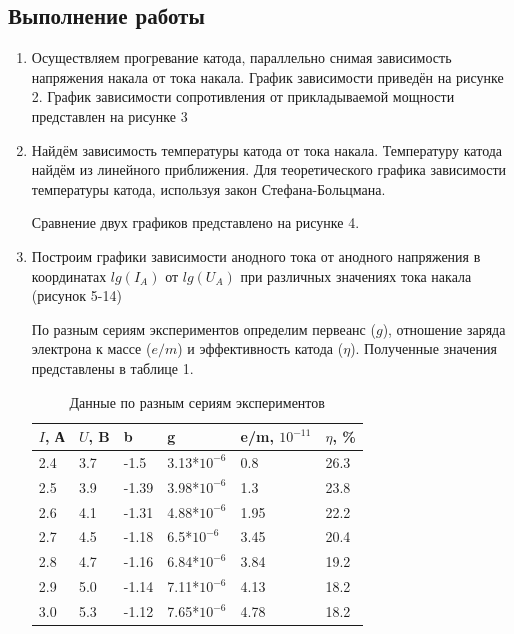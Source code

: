 \documentclass[a4paper]{article}
\begin{document}
\subsection{Выполнение работы}
\begin{enumerate}
    \item Осуществляем прогревание катода, параллельно снимая зависимость напряжения накала от тока накала. График зависимости приведён на рисунке 2. График зависимости сопротивления от прикладываемой мощности представлен на рисунке 3


\item Найдём зависимость температуры катода от тока накала. Температуру катода найдём из линейного приближения. Для теоретического графика зависимости температуры катода, используя закон Стефана-Больцмана.

Сравнение двух графиков представлено на рисунке 4.

\item Построим графики зависимости анодного тока от анодного напряжения в координатах $lg(I_A)$ от $lg(U_A)$ при различных значениях тока накала (рисунок 5-14)

По разным сериям экспериментов определим первеанс ($g$), отношение заряда электрона к массе ($e/m$) и эффективность катода ($\eta$). Полученные значения представлены в таблице 1.

    \begin{table}[h]
    \centering
    \begin{center}
    \caption{Данные по разным сериям экспериментов}
    \end{center}
    \vspace{0.1cm}
    \label{tab:my_label}
    \begin{tabular}{ |p{1cm}|p{1cm}|p{1cm}|p{2cm}|p{2cm}|p{2cm}|}
 \hline
 $I$, А & $U$, B & b & g & e/m, $10^{-11}$ & $\eta$, \% \\
 \hline
 \hline
2.4 & 3.7 & -1.5 & 3.13*$10^{-6}$ & 0.8 & 26.3\\
 \hline
2.5 & 3.9 & -1.39 & 3.98*$10^{-6}$ & 1.3 & 23.8\\
 \hline
2.6 & 4.1 & -1.31 & 4.88*$10^{-6}$ & 1.95 & 22.2\\
 \hline
2.7 & 4.5 & -1.18 & 6.5*$10^{-6}$ & 3.45 & 20.4 \\
 \hline
2.8 & 4.7 & -1.16 & 6.84*$10^{-6}$ & 3.84 & 19.2\\
 \hline
2.9 & 5.0 & -1.14 & 7.11*$10^{-6}$ & 4.13 & 18.2\\
 \hline 
3.0 & 5.3 & -1.12 & 7.65*$10^{-6}$ & 4.78 & 18.2\\
 \hline 

\end{tabular}
\end{table}

\end{enumerate}
\end{document}
